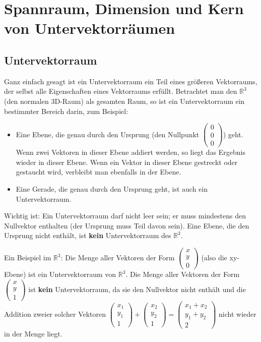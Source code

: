 \chapter{Spannraum, Dimension und Kern von Untervektorräumen}

\section{Untervektorraum}
Ganz einfach gesagt ist ein Untervektorraum ein Teil eines größeren Vektorraums, der selbst alle Eigenschaften eines Vektorraums erfüllt. Betrachtet man den \(\mathbb{R}^3\) (den normalen 3D-Raum) als gesamten Raum, so ist ein Untervektorraum ein bestimmter Bereich darin, zum Beispiel:
\begin{itemize}
    \item Eine Ebene, die genau durch den Ursprung (den Nullpunkt \(\begin{pmatrix} 0 \\ 0 \\ 0 \end{pmatrix}\)) geht. Wenn zwei Vektoren in dieser Ebene addiert werden, so liegt das Ergebnis wieder in dieser Ebene. Wenn ein Vektor in dieser Ebene gestreckt oder gestaucht wird, verbleibt man ebenfalls in der Ebene.
    \item Eine Gerade, die genau durch den Ursprung geht, ist auch ein Untervektorraum.
\end{itemize}
Wichtig ist: Ein Untervektorraum darf nicht leer sein; er muss mindestens den Nullvektor enthalten (der Ursprung muss Teil davon sein). Eine Ebene, die den Ursprung nicht enthält, ist \textbf{kein} Untervektorraum des \(\mathbb{R}^3\).

Ein Beispiel im \(\mathbb{R}^3\): Die Menge aller Vektoren der Form \(\begin{pmatrix} x \\ y \\ 0 \end{pmatrix}\) (also die xy-Ebene) ist ein Untervektorraum von \(\mathbb{R}^3\).
Die Menge aller Vektoren der Form \(\begin{pmatrix} x \\ y \\ 1 \end{pmatrix}\) ist \textbf{kein} Untervektorraum, da sie den Nullvektor nicht enthält und die Addition zweier solcher Vektoren \(\begin{pmatrix} x_1 \\ y_1 \\ 1 \end{pmatrix} + \begin{pmatrix} x_2 \\ y_2 \\ 1 \end{pmatrix} = \begin{pmatrix} x_1+x_2 \\ y_1+y_2 \\ 2 \end{pmatrix}\) nicht wieder in der Menge liegt.

